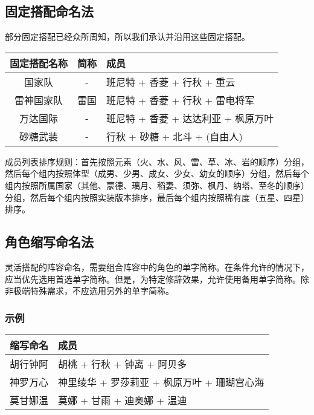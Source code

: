\subsection{固定搭配命名法}

部分固定搭配已经众所周知，所以我们承认并沿用这些固定搭配。

\noindent\begin{tabu}{|c|c|X[c]|}
	\hline
	{固定搭配名称} & {简称} & {成员}                                \\
	\hline
	{国家队}       & {-}    & {班尼特 + 香菱 + 行秋 + 重云}         \\
	{雷神国家队}   & {雷国} & {班尼特 + 香菱 + 行秋 + 雷电将军}     \\
	{万达国际}     & {-}    & {班尼特 + 香菱 + 达达利亚 + 枫原万叶} \\
	{砂糖武装}     & {-}    & {行秋 + 砂糖 + 北斗 + (自由人)}       \\
	\hline
\end{tabu}

成员列表排序规则：首先按照元素（火、水、风、雷、草、冰、岩的顺序）分组，然后每个组内按照体型（成男、少男、成女、少女、幼女的顺序）分组，然后每个组内按照所属国家（其他、蒙德、璃月、稻妻、须弥、枫丹、纳塔、至冬的顺序）分组，然后每个组内按照实装版本排序，最后每个组内按照稀有度（五星、四星）排序。


\subsection{角色缩写命名法}

灵活搭配的阵容命名，需要组合阵容中的角色的单字简称。在条件允许的情况下，应当优先选用首选单字简称。但是，为特定修辞效果，允许使用备用单字简称。除非极端特殊需求，不应选用另外的单字简称。

\subsubsection{示例}

\noindent\begin{tabu}{|c|X[c]|}
	\hline
	{缩写命名} & {成员}                                        \\
	\hline
	{胡行钟阿} & {胡桃 + 行秋 + 钟离 + 阿贝多}                 \\
	{神罗万心} & {神里绫华 + 罗莎莉亚 + 枫原万叶 + 珊瑚宫心海} \\
	{莫甘娜温} & {莫娜 + 甘雨 + 迪奥娜 + 温迪}                 \\
	\hline
\end{tabu}

